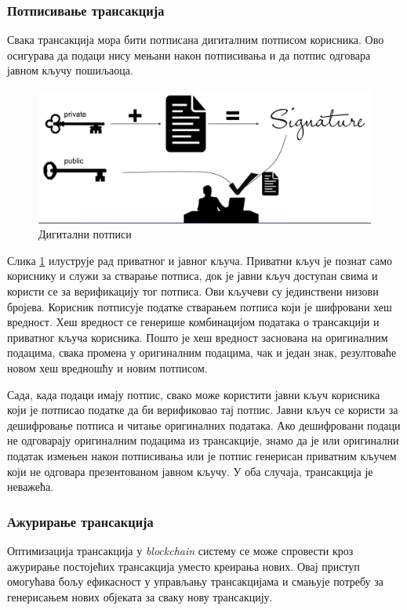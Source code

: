 \documentclass[12pt, a4paper]{article}
\begin{document}
\subsubsection{Потписивање трансакција}
Свака трансакција мора бити потписана дигиталним потписом корисника. Ово осигурава да подаци нису мењани након потписивања и да потпис одговара јавном кључу пошиљаоца.

\begin{figure}[h]
    \centering
    \includegraphics[width=1\linewidth]{slike/signature.png}
    \caption{Дигитални потписи}
    \label{fig:digital-signatures}
\end{figure}

Слика \ref{fig:digital-signatures} илуструје рад приватног и јавног кључа. Приватни кључ је познат само кориснику и служи за стварање потписа, док је јавни кључ доступан свима и користи се за верификацију тог потписа. Ови кључеви су јединствени низови бројева. Корисник потписује податке стварањем потписа који је шифровани хеш вредност. Хеш вредност се генерише комбинацијом података о трансакцији и приватног кључа корисника. Пошто је хеш вредност заснована на оригиналним подацима, свака промена у оригиналним подацима, чак и један знак, резултоваће новом хеш вредношћу и новим потписом.

Сада, када подаци имају потпис, свако може користити јавни кључ корисника који је потписао податке да би верификовао тај потпис. Јавни кључ се користи за дешифровање потписа и читање оригиналних података. Ако дешифровани подаци не одговарају оригиналним подацима из трансакције, знамо да је или оригинални податак измењен након потписивања или је потпис генерисан приватним кључем који не одговара презентованом јавном кључу. У оба случаја, трансакција је неважећа.

\subsubsection{Ажурирање трансакција}
Оптимизација трансакција у \textit{blockchain} систему се може спровести кроз ажурирање постојећих трансакција уместо креирања нових. Овај приступ омогућава бољу ефикасност у управљању трансакцијама и смањује потребу за генерисањем нових објеката за сваку нову трансакцију.
\end{document}
